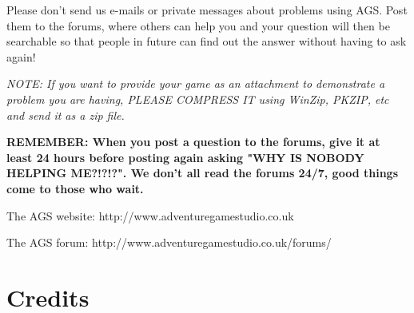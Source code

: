 Please don't send us e-mails or private messages about problems using AGS.
Post them to the forums, where others can help you and your question will
then be searchable so that people in future can find out the answer without
having to ask again!

\it{NOTE:} If you want to provide your game as an attachment to demonstrate a problem you are
having, PLEASE COMPRESS IT using WinZip, PKZIP, etc and send it as a
zip file.

\bf{REMEMBER:} When you post a question to the forums, give it at least 24
hours before posting again asking "WHY IS NOBODY HELPING ME?!?!?". We don't
all read the forums 24/7, good things come to those who wait.

The AGS website: http://www.adventuregamestudio.co.uk

The AGS forum:   http://www.adventuregamestudio.co.uk/forums/


\chapter{Credits}\label{Credits}%

